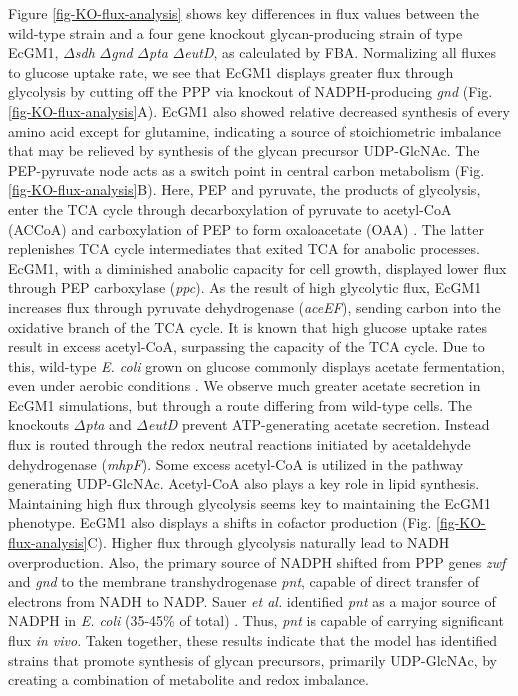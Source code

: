 \documentclass[12pt]{article}
\begin{document}
Figure \ref{fig-KO-flux-analysis} shows key differences in flux values between the wild-type strain and a four gene knockout glycan-producing strain of type EcGM1, $\Delta$\textit{sdh} $\Delta$\textit{gnd} $\Delta$\textit{pta} $\Delta$\textit{eutD}, as calculated by FBA. 
Normalizing all fluxes to glucose uptake rate, we see that EcGM1 displays greater flux through glycolysis by cutting off the PPP via knockout of NADPH-producing \textit{gnd} (Fig. \ref{fig-KO-flux-analysis}A). 
EcGM1 also showed relative decreased synthesis of every amino acid except for glutamine, indicating a source of stoichiometric imbalance that may be relieved by synthesis of the glycan precursor UDP-GlcNAc. 
The PEP-pyruvate node acts as a switch point in central carbon metabolism (Fig. \ref{fig-KO-flux-analysis}B). 
Here, PEP and pyruvate, the products of glycolysis, enter the TCA cycle through decarboxylation of pyruvate to acetyl-CoA (ACCoA) and carboxylation of PEP to form oxaloacetate (OAA) \cite{2005-sauer-eikmanns-FEMSMicrobioRev}. 
The latter replenishes TCA cycle intermediates that exited TCA for anabolic processes. 
EcGM1, with a diminished anabolic capacity for cell growth, displayed lower flux through PEP carboxylase (\textit{ppc}). 
As the result of high glycolytic flux, EcGM1 increases flux through pyruvate dehydrogenase (\textit{aceEF}), sending carbon into the oxidative branch of the TCA cycle. 
It is known that high glucose uptake rates result in excess acetyl-CoA, surpassing the capacity of the TCA cycle. 
Due to this, wild-type \textit{E. coli} grown on glucose commonly displays acetate fermentation, even under aerobic conditions \cite{2005-gosset-MicrobCellFact}. 
We observe much greater acetate secretion in EcGM1 simulations, but through a route differing from wild-type cells. 
The knockouts $\Delta$\textit{pta} and $\Delta$\textit{eutD} prevent ATP-generating acetate secretion. 
Instead flux is routed through the redox neutral reactions initiated by acetaldehyde dehydrogenase (\textit{mhpF}). 
Some excess acetyl-CoA is utilized in the pathway generating UDP-GlcNAc. 
Acetyl-CoA also plays a key role in lipid synthesis. 
Maintaining high flux through glycolysis seems key to maintaining the EcGM1 phenotype. 
EcGM1 also displays a shifts in cofactor production (Fig. \ref{fig-KO-flux-analysis}C). 
Higher flux through glycolysis naturally lead to NADH overproduction. 
Also, the primary source of NADPH shifted from PPP genes \textit{zwf} and \textit{gnd} to the membrane transhydrogenase \textit{pnt}, capable of direct transfer of electrons from NADH to NADP. 
Sauer \textit{et al.} identified \textit{pnt} as a major source of NADPH in \textit{E. coli} (35-45\% of total) \cite{2004-sauer-fischer-JBC}. 
Thus, \textit{pnt} is capable of carrying significant flux \textit{in vivo}. 
Taken together, these results indicate that the model has identified strains that promote synthesis of glycan precursors, primarily UDP-GlcNAc, by creating a combination of metabolite and redox imbalance. 
\end{document}
